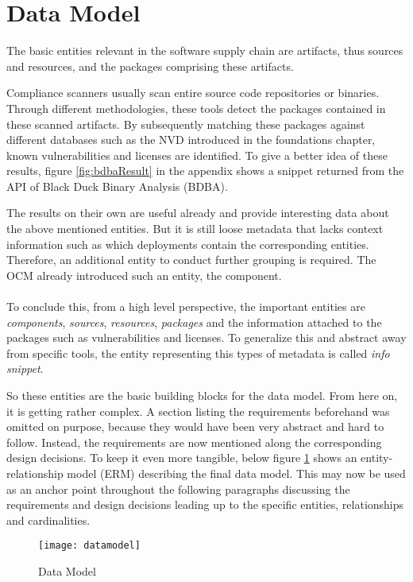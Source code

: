 \section{Data Model}
The basic entities relevant in the software supply chain are artifacts, thus sources and resources, and the packages comprising these artifacts.\par
Compliance scanners usually scan entire source code repositories or binaries. Through different methodologies, these tools detect the packages contained in these scanned artifacts. By subsequently matching these packages against different databases such as the NVD introduced in the foundations chapter, known vulnerabilities and licenses are identified. To give a better idea of these results, figure \ref{fig:bdbaResult} in the appendix shows a snippet returned from the API of Black Duck Binary Analysis (BDBA).\par 
The results on their own are useful already and provide interesting data about the above mentioned entities. But it is still loose metadata that lacks context information such as which deployments contain the corresponding entities. Therefore, an additional entity to conduct further grouping is required. The OCM already introduced such an entity, the component.\\\\
To conclude this, from a high level perspective, the important entities are \emph{components}, \emph{sources}, \emph{resources}, \emph{packages} and the information attached to the packages such as vulnerabilities and licenses. To generalize this and abstract away from specific tools, the entity representing this types of metadata is called \emph{info snippet}.\par 
So these entities are the basic building blocks for the data model. From here on, it is getting rather complex. A section listing the requirements beforehand was omitted on purpose, because they would have been very abstract and hard to follow. Instead, the requirements are now mentioned along the corresponding design decisions. To keep it even more tangible, below figure \ref{fig:DataModel} shows an entity-relationship model (ERM) describing the final data model. This may now be used as an anchor point throughout the following paragraphs discussing the requirements and design decisions leading up to the specific entities, relationships and cardinalities.

\begin{figure}[H]
	\centering
	\texttt{[image: datamodel]}
	\caption[Data Model]{Data Model }
	\label{fig:DataModel}
\end{figure} 




